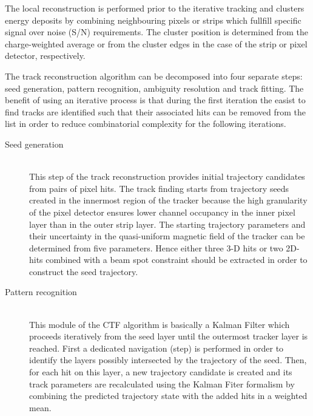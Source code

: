 The local reconstruction is performed prior to the iterative tracking and clusters energy deposits by combining neighbouring pixels or strips which fullfill specific signal over noise (S/N) requirements. The cluster position is determined from the charge-weighted average or from the cluster edges in the case of the strip or pixel detector, respectively.

The track reconstruction algorithm can be decomposed into four separate steps: seed generation, pattern recognition, ambiguity resolution and track fitting.
The benefit of using an iterative process is that during the first iteration the easist to find tracks are identified such that their associated hits can be removed from the list in order to reduce combinatorial complexity for the following iterations.

\begin{myindentpar}
  \begin{description}
    \item[Seed generation] \hfill \\
    This step of the track reconstruction provides initial trajectory candidates from pairs of pixel hits. The track finding starts from trajectory seeds created in the innermost region of the tracker because the high granularity of the pixel detector ensures lower channel occupancy in the inner pixel layer than in the outer strip layer. 
    The starting trajectory parameters and their uncertainty in the quasi-uniform magnetic field of the tracker can be determined from five parameters. Hence either three 3-D hits or two 2D-hits combined with a beam spot constraint should be extracted in order to construct the seed trajectory.
    \item[Pattern recognition] \hfill \\
    This module of the CTF algorithm is basically a Kalman Filter which proceeds iteratively from the seed layer until the outermost tracker layer is reached. %
    First a dedicated navigation (step) is performed in order to identify the layers possibly intersected by the trajectory of the seed. Then, for each hit on this layer, a new trajectory candidate is created and its track parameters are recalculated using the Kalman Fiter formalism by combining the predicted trajectory state with the added hits in a weighted mean.

\end{description}
\end{myindentpar}
